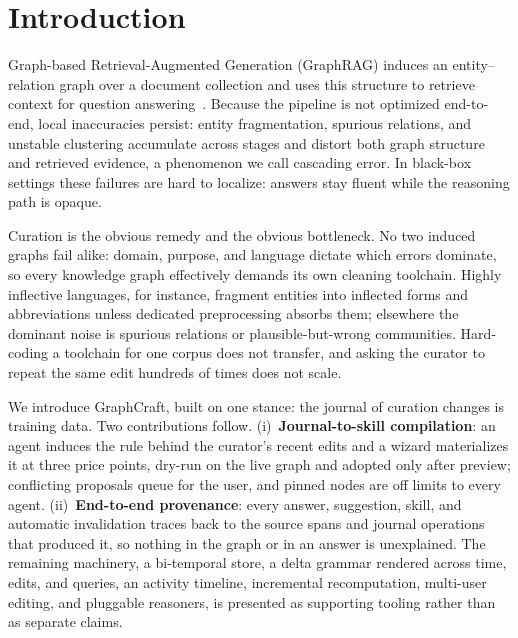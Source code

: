 \documentclass[sigconf]{acmart}
\begin{document}


\maketitle


\section{Introduction}
Graph-based Retrieval-Augmented Generation (GraphRAG) induces an entity--relation graph over a document collection and uses this structure to retrieve context for question answering~\cite{edge2025localglobalgraphrag}. Because the pipeline is not optimized end-to-end, local inaccuracies persist: entity fragmentation, spurious relations, and unstable clustering accumulate across stages and distort both graph structure and retrieved evidence, a phenomenon we call cascading error. In black-box settings these failures are hard to localize: answers stay fluent while the reasoning path is opaque.

Curation is the obvious remedy and the obvious bottleneck. No two induced graphs fail alike: domain, purpose, and language dictate which errors dominate, so every knowledge graph effectively demands its own cleaning toolchain. Highly inflective languages, for instance, fragment entities into inflected forms and abbreviations unless dedicated preprocessing absorbs them; elsewhere the dominant noise is spurious relations or plausible-but-wrong communities. Hard-coding a toolchain for one corpus does not transfer, and asking the curator to repeat the same edit hundreds of times does not scale.

We introduce GraphCraft, built on one stance: the journal of curation changes is training data. Two contributions follow. (i)~\textbf{Journal-to-skill compilation}: an agent induces the rule behind the curator's recent edits and a wizard materializes it at three price points, dry-run on the live graph and adopted only after preview; conflicting proposals queue for the user, and pinned nodes are off limits to every agent. (ii)~\textbf{End-to-end provenance}: every answer, suggestion, skill, and automatic invalidation traces back to the source spans and journal operations that produced it, so nothing in the graph or in an answer is unexplained. The remaining machinery, a bi-temporal store, a delta grammar rendered across time, edits, and queries, an activity timeline, incremental recomputation, multi-user editing, and pluggable reasoners, is presented as supporting tooling rather than as separate claims.
\end{document}
